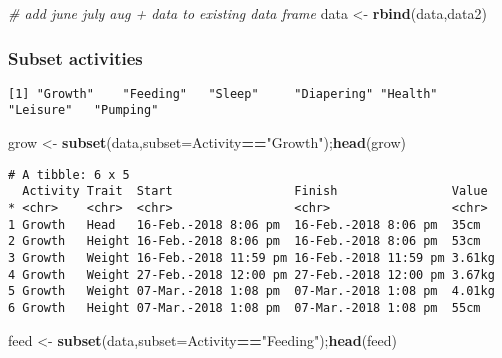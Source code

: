 \documentclass[10,portrait]{article}
\newenvironment{Shaded}{\begin{snugshade}}{\end{snugshade}}
\newcommand{\KeywordTok}[1]{\textcolor[rgb]{0.13,0.29,0.53}{\textbf{#1}}}
\newcommand{\DataTypeTok}[1]{\textcolor[rgb]{0.13,0.29,0.53}{#1}}
\newcommand{\StringTok}[1]{\textcolor[rgb]{0.31,0.60,0.02}{#1}}
\newcommand{\CommentTok}[1]{\textcolor[rgb]{0.56,0.35,0.01}{\textit{#1}}}
\newcommand{\OperatorTok}[1]{\textcolor[rgb]{0.81,0.36,0.00}{\textbf{#1}}}
\newcommand{\NormalTok}[1]{#1}
\begin{document}
\begin{Shaded}
\begin{Highlighting}[]
\CommentTok{# add june july aug + data to existing data frame}
\NormalTok{data <-}\StringTok{ }\KeywordTok{rbind}\NormalTok{(data,data2)}
\end{Highlighting}
\end{Shaded}

\subsubsection{Subset activities}\label{subset-activities}

\begin{Shaded}
\end{Shaded}

\begin{verbatim}
[1] "Growth"    "Feeding"   "Sleep"     "Diapering" "Health"    "Leisure"   "Pumping"  
\end{verbatim}

\begin{Shaded}
\begin{Highlighting}[]
\NormalTok{grow <-}\StringTok{ }\KeywordTok{subset}\NormalTok{(data,}\DataTypeTok{subset=}\NormalTok{Activity}\OperatorTok{==}\StringTok{"Growth"}\NormalTok{);}\KeywordTok{head}\NormalTok{(grow)}
\end{Highlighting}
\end{Shaded}

\begin{verbatim}
# A tibble: 6 x 5
  Activity Trait  Start                 Finish                Value 
* <chr>    <chr>  <chr>                 <chr>                 <chr> 
1 Growth   Head   16-Feb.-2018 8:06 pm  16-Feb.-2018 8:06 pm  35cm  
2 Growth   Height 16-Feb.-2018 8:06 pm  16-Feb.-2018 8:06 pm  53cm  
3 Growth   Weight 16-Feb.-2018 11:59 pm 16-Feb.-2018 11:59 pm 3.61kg
4 Growth   Weight 27-Feb.-2018 12:00 pm 27-Feb.-2018 12:00 pm 3.67kg
5 Growth   Weight 07-Mar.-2018 1:08 pm  07-Mar.-2018 1:08 pm  4.01kg
6 Growth   Height 07-Mar.-2018 1:08 pm  07-Mar.-2018 1:08 pm  55cm  
\end{verbatim}

\begin{Shaded}
\begin{Highlighting}[]
\NormalTok{feed <-}\StringTok{ }\KeywordTok{subset}\NormalTok{(data,}\DataTypeTok{subset=}\NormalTok{Activity}\OperatorTok{==}\StringTok{"Feeding"}\NormalTok{);}\KeywordTok{head}\NormalTok{(feed)}
\end{Highlighting}
\end{Shaded}
\end{document}

